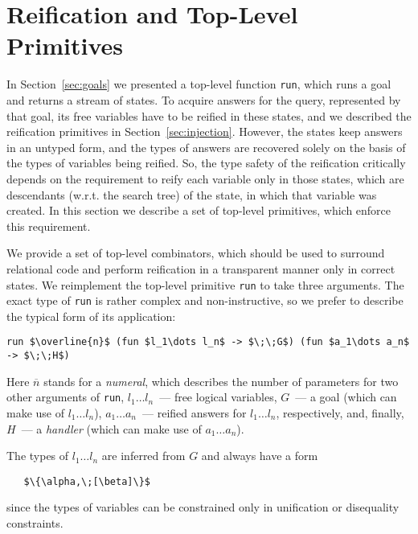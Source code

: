 \section{Reification and Top-Level Primitives}
\label{reification}

In Section~\ref{sec:goals} we presented a top-level function \lstinline{run}, which
runs a goal and returns a stream of states. To acquire answers for the query, 
represented by that goal, its free variables have to be reified in these states, and
we described the reification primitives in Section~\ref{sec:injection}. However, 
the states keep answers in an untyped form, and the types of answers are
recovered solely on the basis of the types of variables being reified. So, the 
type safety of the reification critically depends on the requirement to
reify each variable only in those states, which are descendants (w.r.t. the search tree)
of the state, in which that variable was created. In this section we describe a set of
top-level primitives, which enforce this requirement.

We provide a set of top-level combinators, which should be used to surround relational code
and perform reification in a transparent manner only in correct states.
We reimplement the top-level primitive \lstinline{run} to take three
arguments. The exact type of \lstinline{run} is rather complex and non-instructive,
so we prefer to describe the typical form of its application:

\begin{lstlisting}[mathescape=true]
   run $\overline{n}$ (fun $l_1\dots l_n$ -> $\;\;G$) (fun $a_1\dots a_n$ -> $\;\;H$)
\end{lstlisting}

Here $\overline{n}$ stands for a \emph{numeral}, which describes the number of
parameters for two other arguments of \lstinline{run}, \mbox{$l_1\dots l_n$}~---
free logical variables, $G$~--- a goal (which can make use of \mbox{$l_1\dots l_n$}),
\mbox{$a_1\dots a_n$}~--- reified answers for \mbox{$l_1\dots l_n$}, respectively, and,
finally, $H$~--- a \emph{handler} (which can make use of \mbox{$a_1\dots a_n$}).

The types of \mbox{$l_1\dots l_n$} are inferred from $G$ and always have a form

\begin{lstlisting}
   $\{\alpha,\;[\beta]\}$
\end{lstlisting}

\noindent since the types of variables can be constrained only in unification or disequality constraints.

